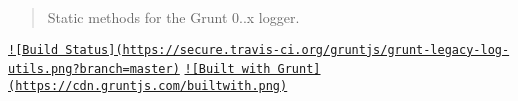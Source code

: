 \begin{quote}
Static methods for the Grunt 0..\+x logger. \end{quote}


\href{http://travis-ci.org/gruntjs/grunt-legacy-log-utils}{\tt !\mbox{[}Build Status\mbox{]}(https\+://secure.\+travis-\/ci.\+org/gruntjs/grunt-\/legacy-\/log-\/utils.\+png?branch=master)} \href{http://gruntjs.com/}{\tt !\mbox{[}Built with Grunt\mbox{]}(https\+://cdn.\+gruntjs.\+com/builtwith.\+png)} 